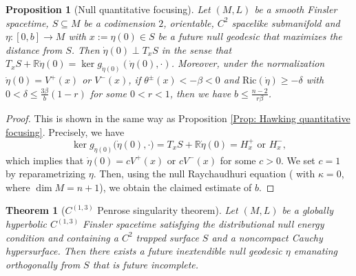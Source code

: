 \documentclass[a4paper,11pt]{article}
\numberwithin{equation}{section}
\theoremstyle{definition}
\theoremstyle{plain}
\newtheorem{Theorem}[Definition]{Theorem}
\newtheorem{Proposition}[Definition]{Proposition}
\newcommand{\R}{\mathbb R}
\newcommand{\Ric}{\mathrm{Ric}}
\begin{document}
\begin{Proposition}[Null quantitative focusing]
\label{Prop: Null quantitative focusing}
Let $(M,L)$ be a smooth Finsler spacetime, $S \subseteq M$ be a codimension $2$, orientable, $C^2$ spacelike submanifold and $\eta:[0,b] \to M$ with $x:=\eta(0) \in S$ be a future null geodesic that maximizes the distance from $S$. 
Then $\dot{\eta}(0) \perp T_xS$ in the sense that $T_xS + \R \dot{\eta}(0)= \ker g_{\dot{\eta}(0)}(\dot{\eta}(0),\cdot)$.
Moreover, under the normalization $\dot{\eta}(0)=V^+(x)$ or $V^-(x)$, if $\theta^\pm(x) < - \beta<0$ and $\Ric(\dot \eta) \geq - \delta$ with $0 < \delta \leq \frac{3 \beta}{b}(1-r)$ for some $0 < r < 1$, then we have $b \leq \frac{n-2}{r\beta}$.
\end{Proposition}

\begin{proof}
This is shown in the same way as Proposition \ref{Prop: Hawking quantitative focusing}.
Precisely, we have
\[
\ker g_{\dot{\eta}(0)}\bigl(\dot{\eta}(0),\cdot\bigr)
=T_xS + \R \dot{\eta}(0)
=H^+_x \text{ or } H^-_x,
\]
which implies that $\dot{\eta}(0)=cV^+(x)$ or $cV^-(x)$ for some $c>0$.
We set $c=1$ by reparametrizing $\eta$.
Then, using the null Raychaudhuri equation (\cite[Eq.\ (31)]{MinguzziRaychaudhuri} with $\kappa=0$, where $\dim M=n+1$), we obtain the claimed estimate of $b$.
\end{proof}


\begin{Theorem}[$C^{(1,3)}$ Penrose singularity theorem]
\label{theorem: unweighted penrose}
Let $(M,L)$ be a globally hyperbolic $C^{(1,3)}$ Finsler spacetime satisfying the distributional null energy condition and containing a $C^2$ trapped surface $S$ and a noncompact Cauchy hypersurface. 
Then there exists a future inextendible null geodesic $\eta$ emanating orthogonally from $S$ that is future incomplete.
\end{Theorem}
\end{document}
